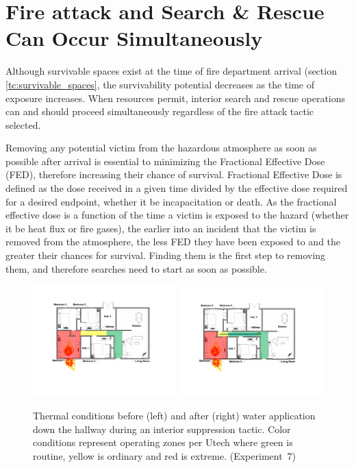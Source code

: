 \documentclass[12pt,oneside]{book}
\begin{document}
\section{Fire attack and Search \& Rescue Can Occur Simultaneously} \label{tc:search_during_fire_attack}
Although survivable spaces exist at the time of fire department arrival (section \ref{tc:survivable_spaces}, the survivability potential decreases as the time of exposure increases. When resources permit, interior search and rescue operations can and should proceed simultaneously regardless of the fire attack tactic selected.

Removing any potential victim from the hazardous atmosphere as soon as possible after arrival is essential to minimizing the Fractional Effective Dose (FED), therefore increasing their chance of survival. Fractional Effective Dose is defined as the dose received in a given time divided by the effective dose required for a desired endpoint, whether it be incapacitation or death. As the fractional effective dose is a function of the time a victim is exposed to the hazard (whether it be heat flux or fire gases), the earlier into an incident that the victim is removed from the atmosphere, the less FED they have been exposed to and the greater their chances for survival. Finding them is the first step to removing them, and therefore searches need to start as soon as possible.

\begin{figure}[H]
\centering
\includegraphics[width=0.495\textwidth]{../0_Images/Tactical_Considerations/Simultaneous_Search/Interior_Pre}
\includegraphics[width=0.49\textwidth]{../0_Images/Tactical_Considerations/Simultaneous_Search/Interior_Post}
\caption[Thermal Conditions - Simultaneous Search - Interior]{Thermal conditions before (left) and after (right) water application down the hallway during an interior suppression tactic. Color conditions represent operating zones per Utech \cite{Utech_Firefighter_Clothing} where green is routine, yellow is ordinary and red is extreme. (Experiment~7)}
\label{fig:simultaneous_search_tc_interior}
\end{figure}
\end{document}
